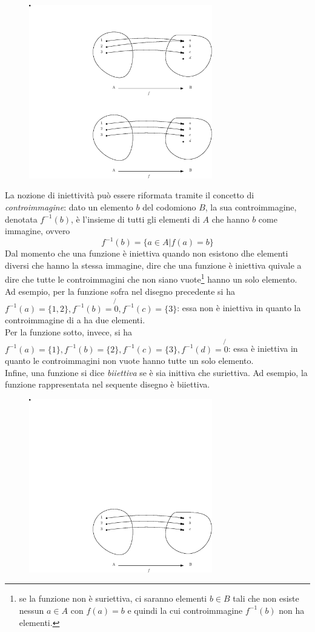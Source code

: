 \begin{figure}[th]
  \centering
  \includegraphics[width=8cm]{img/finiti/imgex4-4-2.eps}
\end{figure}

La nozione di iniettività può essere riformata tramite il concetto di \textit{controimmagine}:
dato un elemento $b$ del codomiono $B$, la sua controimmagine, denotata $f^{-1}(b)$, è l'insieme
di tutti gli elementi di $A$ che hanno $b$ come immagine, ovvero
\begin{equation*}
  f^{-1}(b)=\{a\in A|f(a)=b\}
\end{equation*}
Dal momento che una funzione è iniettiva quando non esistono dhe elementi diversi che hanno la
stessa immagine, dire che una funzione è iniettiva quivale a dire che tutte le controimmagini
che non siano vuote\footnote{se la funzione non è suriettiva, ci saranno elementi $b\in B$ tali
  che non esiste nessun $a\in A$ con $f(a)=b$ e quindi la cui controimmagine $f^{-1}(b)$ non ha
  elementi.} hanno un solo elemento.\\
Ad esempio, per la funzione sofra nel disegno precedente si ha $f^{-1}(a)=\{1,2\},f^{-1}(b)=
\not{0},f^{-1}(c)=\{3\}$: essa non è iniettiva in quanto la controimmagine di a ha due elementi.\\
Per la funzione sotto, invece, si ha $f^{-1}(a)=\{1\}, f^{-1}(b)=\{2\},f^{-1}(c)=\{3\},
f^{-1}(d)=\not{0}$: essa è iniettiva in quanto le controimmagini non vuote hanno tutte un solo
elemento.\\
Infine, una funzione si dice \textit{biiettiva} se è sia inittiva che suriettiva. Ad esempio,
la funzione rappresentata nel sequente disegno è biiettiva.
\begin{figure}[th]
  \centering
  \includegraphics[width=8cm]{img/finiti/imgex4-4-3.eps}
\end{figure}

